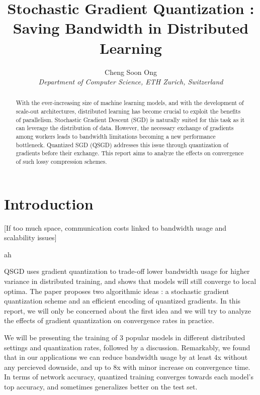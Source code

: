 \documentclass[10pt,conference,compsocconf]{IEEEtran}
\begin{document}
\title{Stochastic Gradient Quantization : \\ Saving Bandwidth in Distributed Learning}

\author{
  Cheng Soon Ong\\
  \textit{Department of Computer Science, ETH Zurich, Switzerland}
}

\maketitle

\begin{abstract}

	With the ever-increasing size of machine learning models, and with the development of scale-out architectures, distributed learning has become crucial to exploit the benefits of parallelism. Stochastic Gradient Descent (SGD) is naturally suited for this task as it can leverage the distribution of data. However, the necessary exchange of gradients among workers leads to bandwidth limitations becoming a new performance bottleneck. Quantized SGD (QSGD) addresses this issue through quantization of gradients before their exchange. This report aims to analyze the effects on convergence of such lossy compression schemes.
\end{abstract}

\section{Introduction}

[If too much space, communication costs linked to bandwidth usage and scalability issues]

ah

QSGD \cite{quant}  uses gradient quantization to trade-off lower bandwidth usage for higher variance in distributed training, and shows that models will still converge to local optima. The paper proposes two algorithmic ideas : a stochastic gradient quantization scheme and an efficient encoding of quantized gradients. In this report, we will only be concerned about the first idea and we will try to analyze the effects of gradient quantization on convergence rates in practice.

We will be presenting the training of 3 popular models in different distributed settings and quantization rates, followed by a discussion. Remarkably, we found that in our applications we can reduce bandwidth usage by at least 4x without any percieved downside, and up to 8x with minor increase on convergence time. In terms of network accuracy, quantized training converges towards each model's top accuracy, and sometimes generalizes better on the test set.
\end{document}

